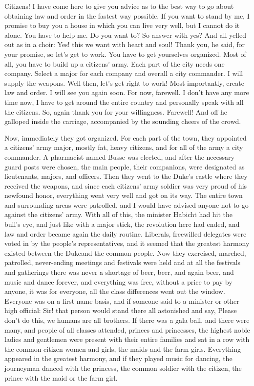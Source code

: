 Citizens! I have come here to give you advice as to the best way to go about obtaining law and order in the fastest way possible. If you want to stand by me, I promise to buy you a house in which you can live very well, but I cannot do it alone. You have to help me. Do you want to? So answer with yes? And all yelled out as in a choir: Yes! this we want with heart and soul! Thank you, he said, for your promise, so let's get to work. You have to get yourselves organized. Most of all, you have to build up a citizens' army. Each part of the city needs one company. Select a major for each company and overall a city commander. I will supply the weapons. Well then, let's get right to work! Most importantly, create law and order. I will see you again soon. For now, farewell. I don't have any more time now, I have to get around the entire country and personally speak with all the citizens. So, again thank you for your willingness. Farewell! And off he galloped inside the carriage, accompanied by the sounding cheers of the crowd.

Now, immediately they got organized. For each part of the town, they appointed a citizens' army major, mostly fat, heavy citizens, and for all of the army a city commander. A pharmacist named Busse was elected, and after the necessary guard posts were chosen, the main people, their companions, were designated as lieutenants, majors, and officers. Then they went to the Duke's castle where they received the weapons, and since each citizens' army soldier was very proud of his newfound honor, everything went very well and got on its way. The entire town and surrounding areas were patrolled, and I would have advised anyone not to go against the citizens' army. With all of this, the minister Habicht had hit the bull's eye, and just like with a major stick, the revolution here had ended, and law and order became again the daily routine. Liberals, freewilled delegates were voted in by the people's representatives, and it seemed that the greatest harmony existed between the Dukeand the common people. Now they exercised, marched, patrolled, never-ending meetings and festivals were held and at all the festivals and gatherings there was never a shortage of beer, beer, and again beer, and music and dance forever, and everything was free, without a price to pay by anyone, it was for everyone, all the class differences went out the window. Everyone was on a first-name basis, and if someone said to a minister or other high official: Sir! that person would stand there all astonished and say, Please don't do this, we humans are all brothers. If there was a gala ball, and there were many, and people of all classes attended, princes and princesses, the highest noble ladies and gentlemen were present with their entire families and sat in a row with the common citizen women and girls, the maids and the farm girls. Everything appeared in the greatest harmony, and if they played music for dancing, the journeyman danced with the princess, the common soldier with the citizen, the prince with the maid or the farm girl.

